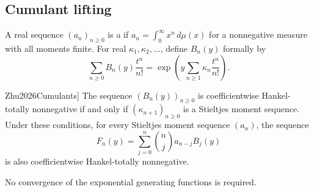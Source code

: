 \subsection[hankelCumulantLifting]{Cumulant lifting}

A real sequence $(a_n)_{n\geq0}$ is a 
if $a_n=\int_0^\infty x^n\,d\mu(x)$ for a nonnegative measure with all
moments finite. For real $\kappa_1,\kappa_2,\ldots$, define $B_n(y)$ formally by
\[
 \sum_{n\geq0}B_n(y)\frac{t^n}{n!}
 =\exp\left(y\sum_{n\geq1}\kappa_n\frac{t^n}{n!}\right).
\]
\begin{theorem}[\cite[Thm.~1.6]{Zhu2026Cumulants}]
The sequence $(B_n(y))_{n\geq0}$ is coefficientwise Hankel-totally
nonnegative if and only if $(\kappa_{n+1})_{n\geq0}$ is a Stieltjes
moment sequence. Under these conditions, for every Stieltjes moment
sequence $(a_n)$, the sequence
\[
 F_n(y)=\sum_{j=0}^n\binom{n}{j}a_{n-j}B_j(y)
\]
is also coefficientwise Hankel-totally nonnegative.
\end{theorem}
No convergence of the exponential generating functions is required.
